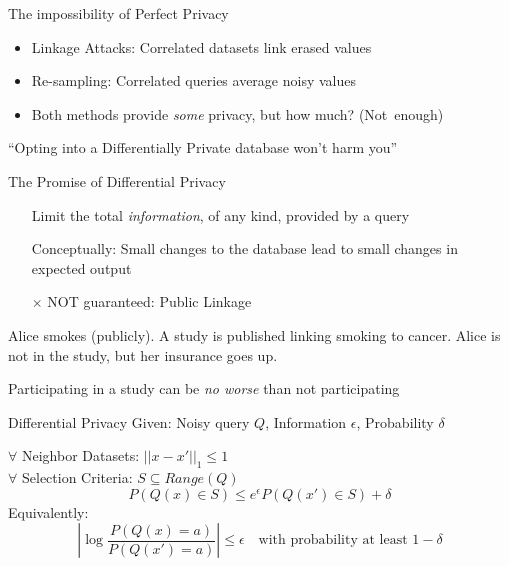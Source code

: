 \documentclass{beamer}
\begin{document}
\begin{frame}{The impossibility of Perfect Privacy}
  \begin{itemize}
    \item Linkage Attacks: Correlated datasets link erased values
    \item Re-sampling: Correlated queries average noisy values
    \item Both methods provide {\it some} privacy, but how much? (Not~enough)
  \end{itemize}
  \begin{definition}
    ``Opting into a Differentially Private database won't harm you''
  \end{definition}
\end{frame}

\begin{frame}{The Promise of Differential Privacy}
  \begin{itemize}
    \item[\checkmark] Limit the total {\it information}, of any kind, provided by a query
    \item[\checkmark] Conceptually: Small changes to the database lead to small changes in expected output
    \item[$\times$]NOT guaranteed: Public Linkage
  \end{itemize}
  \begin{example}
  Alice smokes (publicly).
  A study is published linking smoking to cancer.
  Alice is not in the study, but her insurance goes up.
  \end{example}
  \pause
  \begin{block}{}
    \alert{Participating in a study can be {\it no worse} than not participating}
  \end{block}
\end{frame}

\begin{frame}{Differential Privacy}
    Given: Noisy query $Q$, Information $\epsilon$, Probability $\delta$
  \begin{definition}
    $\forall$ Neighbor Datasets: $||x-x'||_1 \leq 1$\\
    $\forall$ Selection Criteria: $S \subseteq Range(Q)$
    \[P(Q(x)\in S) \leq e^{\epsilon} P(Q(x') \in S) + \delta\]
    Equivalently:
    \[\left| \log{\frac{P(Q(x)=a)}{P(Q(x')=a)}}\right| \leq \epsilon \quad \mbox{with probability at least } 1 - \delta\]
  \end{definition}
\end{frame}
\end{document}
